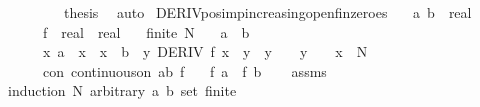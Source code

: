 \begin{isabellebody}
\isanewline
\ \ \isamarkupfalse%
\isanewline
\ \ \isamarkupfalse%
\ \isamarkupfalse%
\ {\isacharquery}{\kern0pt}thesis\ \isamarkupfalse%
\ auto\isanewline
{}\isamarkupfalse%
%
\endisatagproof
{\isafoldproof}%
%
\isadelimproof
%
\endisadelimproof
%
\isadelimdocument
%
\endisadelimdocument
%
\isatagdocument
%
\isamarkuptrue%
%
\endisatagdocument
{\isafolddocument}%
%
\isadelimdocument
%
\endisadelimdocument
{}\isamarkupfalse%
\ DERIV{\isacharunderscore}{\kern0pt}pos{\isacharunderscore}{\kern0pt}imp{\isacharunderscore}{\kern0pt}increasing{\isacharunderscore}{\kern0pt}open{\isacharunderscore}{\kern0pt}fin{\isacharunderscore}{\kern0pt}zeroes{\isacharcolon}{\kern0pt}\isanewline
\ \ \ a\ b\ {\isacharcolon}{\kern0pt}{\isacharcolon}{\kern0pt}\ real\isanewline
\ \ \ \ \ f\ {\isacharcolon}{\kern0pt}{\isacharcolon}{\kern0pt}\ {\isachardoublequoteopen}real\ {\isasymRightarrow}\ real{\isachardoublequoteclose}\isanewline
\ \ \ {\isachardoublequoteopen}finite\ N{\isachardoublequoteclose}\isanewline
\ \ \ {\isachardoublequoteopen}a\ {\isacharless}{\kern0pt}\ b{\isachardoublequoteclose}\isanewline
\ \ \ \ \ {\isachardoublequoteopen}{\isasymAnd}x{\isachardot}{\kern0pt}\ a\ {\isacharless}{\kern0pt}\ x\ {\isasymLongrightarrow}\ x\ {\isacharless}{\kern0pt}\ b\ {\isasymLongrightarrow}\ {\isacharparenleft}{\kern0pt}{\isasymexists}y{\isachardot}{\kern0pt}\ DERIV\ f\ x\ {\isacharcolon}{\kern0pt}{\isachargreater}{\kern0pt}\ y\ {\isasymand}\ y\ {\isasymge}\ {}\ {\isasymand}\ {\isacharparenleft}{\kern0pt}y\ {\isacharequal}{\kern0pt}\ {}\ {\isasymlongrightarrow}\ x\ {\isasymin}\ N{\isacharparenright}{\kern0pt}{\isacharparenright}{\kern0pt}{\isachardoublequoteclose}\isanewline
\ \ \ \ \ con{\isacharcolon}{\kern0pt}\ {\isachardoublequoteopen}continuous{\isacharunderscore}{\kern0pt}on\ {\isacharbraceleft}{\kern0pt}a{\isachardot}{\kern0pt}{\isachardot}{\kern0pt}b{\isacharbraceright}{\kern0pt}\ f{\isachardoublequoteclose}\isanewline
\ \ \ {\isachardoublequoteopen}f\ a\ {\isacharless}{\kern0pt}\ f\ b{\isachardoublequoteclose}\isanewline
%
\isadelimproof
\ \ %
\endisadelimproof
%
\isatagproof
{}\isamarkupfalse%
\ assms\isanewline
{}\isamarkupfalse%
{\isacharparenleft}{\kern0pt}induction\ N\ arbitrary{\isacharcolon}{\kern0pt}\ a\ b\ set{\isacharcolon}{\kern0pt}\ finite{\isacharparenright}{\kern0pt}\isanewline

\end{isabellebody}
